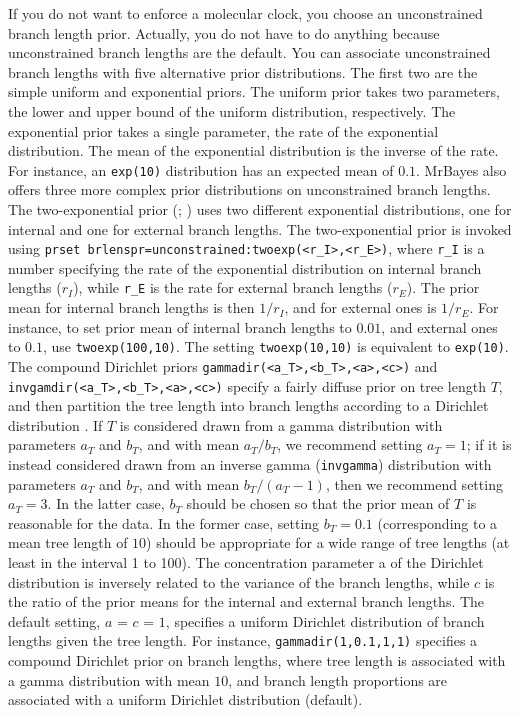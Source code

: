 \documentclass[12pt]{book}
\newcommand{\ttt}[1]{\texttt{#1}}
\begin{document}
If you do not want to enforce a molecular clock, you choose an unconstrained branch length prior.
Actually, you do not have to do anything because unconstrained branch lengths are the default. You
can associate unconstrained branch lengths with five alternative prior distributions. The first two
are the simple uniform and exponential priors. The uniform prior takes two parameters, the lower
and upper bound of the uniform distribution, respectively. The exponential prior takes a single
parameter, the rate of the exponential distribution. The mean of the exponential distribution is
the inverse of the rate. For instance, an \ttt{exp(10)} distribution has an expected mean of $0.1$.
MrBayes also offers three more complex prior distributions on unconstrained branch lengths. The
two-exponential prior (\citet{yang05}; \citet{yang07}) uses two different exponential
distributions, one for internal and one for external branch lengths. The two-exponential prior is
invoked using \ttt{prset brlenspr=unconstrained:twoexp(<r\_I>,<r\_E>)}, where \ttt{r\_I} is a
number specifying the rate of the exponential distribution on internal branch lengths ($r_{I}$),
while \ttt{r\_E} is the rate for external branch lengths ($r_{E}$). The prior mean for internal
branch lengths is then $1/r_{I}$, and for external ones is $1/r_{E}$. For instance, to set prior
mean of internal branch lengths to $0.01$, and external ones to $0.1$, use \ttt{twoexp(100,10)}.
The setting \ttt{twoexp(10,10)} is equivalent to \ttt{exp(10)}. The compound Dirichlet priors
\ttt{gammadir(<a\_T>,<b\_T>,<a>,<c>)} and \ttt{invgamdir(<a\_T>,<b\_T>,<a>,<c>)} specify a fairly
diffuse prior on tree length $T$, and then partition the tree length into branch lengths according
to a Dirichlet distribution \citep{rannala12}. If $T$ is considered drawn from a gamma
distribution with parameters $a_{T}$ and $b_{T}$, and with mean $a_{T}/b_{T}$, we recommend setting
$a_{T} = 1$; if it is instead considered drawn from an inverse gamma (\ttt{invgamma}) distribution
with parameters $a_{T}$ and $b_{T}$, and with mean $b_{T}/(a_{T} - 1)$, then we recommend setting
$a_{T} = 3$. In the latter case, $b_{T}$ should be chosen so that the prior mean of $T$ is
reasonable for the data. In the former case, setting $b_{T} = 0.1$ (corresponding to a mean tree
length of $10$) should be appropriate for a wide range of tree lengths (at least in the interval 1
to 100). The concentration parameter a of the Dirichlet distribution is inversely related to the
variance of the branch lengths, while $c$ is the ratio of the prior means for the internal and
external branch lengths. The default setting, $a$ = $c$ = $1$, specifies a uniform Dirichlet
distribution of branch lengths given the tree length. For instance, \ttt{gammadir(1,0.1,1,1)}
specifies a compound Dirichlet prior on branch lengths, where tree length is associated with a
gamma distribution with mean $10$, and branch length proportions are associated with a uniform
Dirichlet distribution (default).
\end{document}
